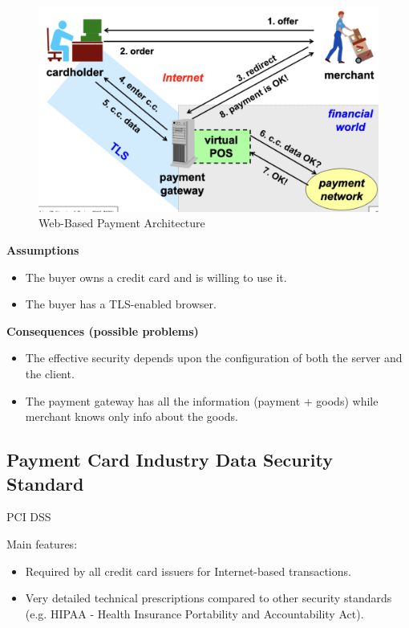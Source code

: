 \begin{figure}[H]
    \centering
    \includegraphics[width=\linewidth]{Images/Appsec/wb_pay.png}
    \caption{Web-Based Payment Architecture}
    \label{fig:wb_pay}
\end{figure}

\begin{center}
    \textbf{Assumptions}
\end{center}

\begin{itemize}
    \item The buyer owns a credit card and is willing to use it.
    \item The buyer has a TLS-enabled browser.
\end{itemize}
\begin{center}
    \textbf{Consequences (possible problems)}
\end{center}
\begin{itemize}
    \item The effective security depends upon the configuration of both the server and the client.
    \item The payment gateway has all the information (payment + goods) while merchant knows only info about the goods.
\end{itemize}

\clearpage 

\subsection{Payment Card Industry Data Security Standard}
\begin{center}
    PCI DSS
\end{center}

Main features:
\begin{itemize}
    \item Required by all credit card issuers for Internet-based transactions.
    \item Very detailed technical prescriptions compared to other security standards (e.g. HIPAA - Health Insurance Portability and Accountability Act).
\end{itemize}

